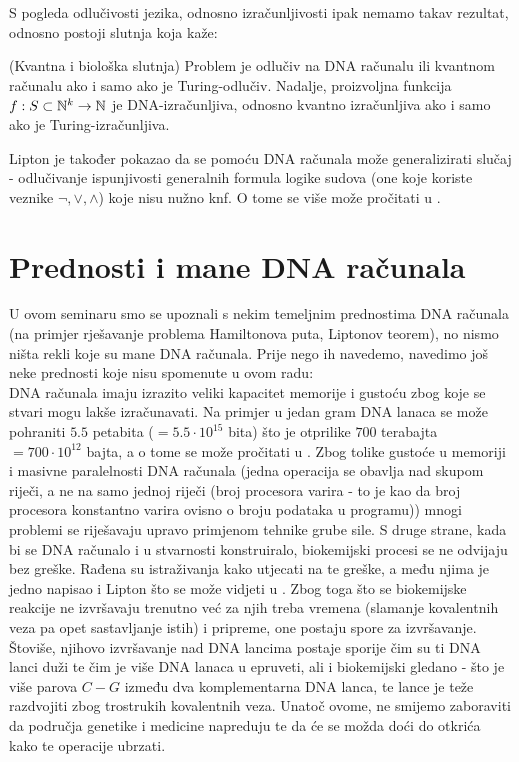\documentclass[12pt, a4paper]{book}
\begin{document}
\begin{spacing}{1.5}
S pogleda odlučivosti jezika, odnosno izračunljivosti ipak nemamo takav rezultat, odnosno postoji slutnja koja kaže:
\begin{conj} \cite{CNTYan} (Kvantna i biološka slutnja) Problem je odlučiv na DNA računalu ili kvantnom računalu ako i samo ako je Turing-odlučiv.
Nadalje, proizvoljna funkcija $f: S \subset \mathbb{N}^k \to \mathbb{N}$ je DNA-izračunljiva, odnosno kvantno izračunljiva ako i samo ako je Turing-izračunljiva.
\end{conj}
Lipton je također pokazao da se pomoću DNA računala može generalizirati slučaj - odlučivanje ispunjivosti generalnih formula logike sudova (one koje koriste veznike $\neg, \vee, \wedge$) koje nisu nužno knf. O tome se više može pročitati u \cite{Lipton}. 
\section{Prednosti i mane DNA računala}
U ovom seminaru smo se upoznali s nekim temeljnim prednostima DNA računala (na primjer rješavanje problema Hamiltonova puta, Liptonov teorem), no nismo ništa rekli koje su mane DNA računala. Prije nego ih navedemo, navedimo još neke prednosti koje nisu spomenute u ovom radu:\\
DNA računala imaju izrazito veliki kapacitet memorije i gustoću  zbog koje se stvari mogu lakše izračunavati. Na primjer u jedan gram DNA lanaca se može pohraniti $5.5$ petabita ($=5.5\cdot 10^{15}$ bita) što je otprilike $700$ terabajta $= 700 \cdot 10^{12}$ bajta, a o tome se može pročitati u \cite{Church}. Zbog tolike gustoće u memoriji i masivne paralelnosti DNA računala (jedna operacija se obavlja nad skupom riječi, a ne na samo jednoj riječi (broj procesora varira - to je kao da broj procesora konstantno varira ovisno o broju podataka u programu)) mnogi problemi se riješavaju upravo primjenom tehnike grube sile. S druge strane, kada bi se DNA računalo i u stvarnosti konstruiralo, biokemijski procesi se ne odvijaju bez greške. Rađena su istraživanja kako utjecati na te greške, a među njima je jedno napisao i Lipton što se može vidjeti u \cite{DNAerr}. Zbog toga što se biokemijske reakcije ne izvršavaju trenutno već za njih treba vremena (slamanje kovalentnih veza pa opet sastavljanje istih) i pripreme, one postaju spore za izvršavanje. Štoviše, njihovo izvršavanje nad DNA lancima postaje sporije čim su ti DNA lanci duži te čim je više DNA lanaca u epruveti, ali i biokemijski gledano - što je više parova $C-G$ između dva komplementarna DNA lanca, te lance je teže razdvojiti zbog trostrukih kovalentnih veza. Unatoč ovome, ne smijemo zaboraviti da područja genetike i medicine napreduju te da će se možda doći do otkrića kako te operacije ubrzati.
\newpage
\nocite{*}


\end{spacing}
\end{document}
